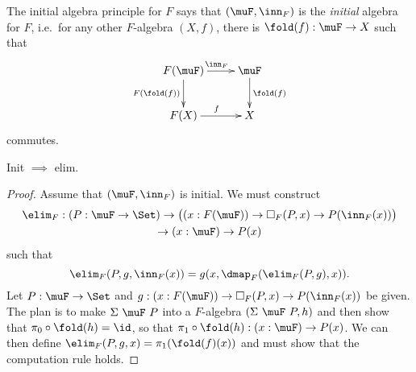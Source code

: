 \documentclass{article}
\begin{document}
\begin{principle}[Init]
  The initial algebra principle for $F$ says that $(\muF, \inn_F)$ is the \emph{initial} algebra for $F$, i.e.\ for any other $F$-algebra $(X, f)$, there is $\fold(f) : \muF \to X$ such that
\[
\xymatrix
{
F(\muF) \ar^{\inn_F}[r] \ar_{F(\fold(f))}[d] & \muF \ar^{\fold(f)}[d]\\
F(X) \ar^{f}[r] & X
}
\]
commutes.
\end{principle}

\begin{problem}
  Init $\implies$ elim.
\end{problem}
\begin{proof}
  Assume that $(\muF, \inn_F)$ is initial. We must construct
\begin{multline*}
\elim_F : (P : \muF \to \Set) \to \big( (x : F(\muF)) \to \square_F(P, x) \to P(\inn_F(x))\big) \\ \to (x : \muF) \to P(x)
\end{multline*}
such that
\[
\elim_F(P, g, \inn_F(x)) = g(x, \dmap_F(\elim_F(P, g), x)).
\]
Let $P : \muF \to \Set$ and $g : (x : F(\muF)) \to \square_F(P, x) \to P(\inn_F(x))$ be given. The plan is to make $\Sigma\ \muF\ P$ into a $F$-algebra $(\Sigma\ \muF\ P, h)$ and then show that $\pi_0 \circ \fold(h) = \id$, so that $\pi_1 \circ \fold(h) : (x : \muF) \to P(x)$. We can then define $\elim_F(P, g, x) = \pi_1(\fold(f)(x))$ and must show that the computation rule holds.


\end{proof}
\end{document}
